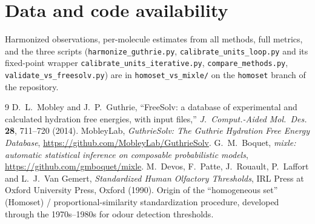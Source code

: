 \documentclass[11pt]{article}
\begin{document}
\section*{Data and code availability}
Harmonized observations, per-molecule estimates from all methods, full metrics, and the three
scripts (\texttt{harmonize\_guthrie.py}, \texttt{calibrate\_units\_loop.py} and its fixed-point
wrapper \texttt{calibrate\_units\_iterative.py}, \texttt{compare\_methods.py},
\texttt{validate\_vs\_freesolv.py}) are in \texttt{homoset\_vs\_mixle/} on the \texttt{homoset}
branch of the repository.

\begin{thebibliography}{9}
 D.~L.~Mobley and J.~P.~Guthrie, ``FreeSolv: a database of experimental and
calculated hydration free energies, with input files,'' \emph{J.\ Comput.-Aided Mol.\ Des.}
\textbf{28}, 711--720 (2014).
 MobleyLab, \emph{GuthrieSolv: The Guthrie Hydration Free Energy Database},
\url{https://github.com/MobleyLab/GuthrieSolv}.
 G.~M.~Boquet, \emph{mixle: automatic statistical inference on composable
probabilistic models}, \url{https://github.com/gmboquet/mixle}.
 M.~Devos, F.~Patte, J.~Rouault, P.~Laffort and L.~J.~Van Gemert,
\emph{Standardized Human Olfactory Thresholds}, IRL Press at Oxford University Press, Oxford
(1990). Origin of the ``homogeneous set'' (Homoset) / proportional-similarity standardization
procedure, developed through the 1970s--1980s for odour detection thresholds.
\end{thebibliography}
\end{document}
